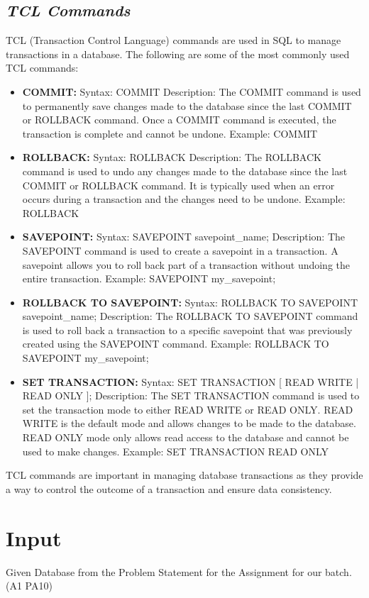 \documentclass{article}
\begin{document}
\subsection{\textit{TCL Commands}}
TCL (Transaction Control Language) commands are used in SQL to manage transactions in a database. The following are some of the most commonly used TCL commands:
\begin{itemize}
    \item \textbf{COMMIT:}
    Syntax: COMMIT\;
    Description: The COMMIT command is used to permanently save changes made to the database since the last COMMIT or ROLLBACK command. Once a COMMIT command is executed, the transaction is complete and cannot be undone.
    Example: COMMIT\;
    \item \textbf{ROLLBACK:}
    Syntax: ROLLBACK\;
    Description: The ROLLBACK command is used to undo any changes made to the database since the last COMMIT or ROLLBACK command. It is typically used when an error occurs during a transaction and the changes need to be undone.
    Example: ROLLBACK\;
    \item \textbf{SAVEPOINT:}
    Syntax: SAVEPOINT savepoint\_name;
    Description: The SAVEPOINT command is used to create a savepoint in a transaction. A savepoint allows you to roll back part of a transaction without undoing the entire transaction.
    Example: SAVEPOINT my\_savepoint;
    \item \textbf{ROLLBACK TO SAVEPOINT:}
    Syntax: ROLLBACK TO SAVEPOINT savepoint\_name;
    Description: The ROLLBACK TO SAVEPOINT command is used to roll back a transaction to a specific savepoint that was previously created using the SAVEPOINT command.
    Example: ROLLBACK TO SAVEPOINT my\_savepoint;
    \item \textbf{SET TRANSACTION:}
    Syntax: SET TRANSACTION [ READ WRITE | READ ONLY ];
    Description: The SET TRANSACTION command is used to set the transaction mode to either READ WRITE or READ ONLY. READ WRITE is the default mode and allows changes to be made to the database. READ ONLY mode only allows read access to the database and cannot be used to make changes.
    Example: SET TRANSACTION READ ONLY\;
\end{itemize}
TCL commands are important in managing database transactions as they provide a way to control the outcome of a transaction and ensure data consistency.
\section{\textbf{Input}}
Given Database from the Problem Statement for the Assignment for our batch. (A1 PA10)
\end{document}
